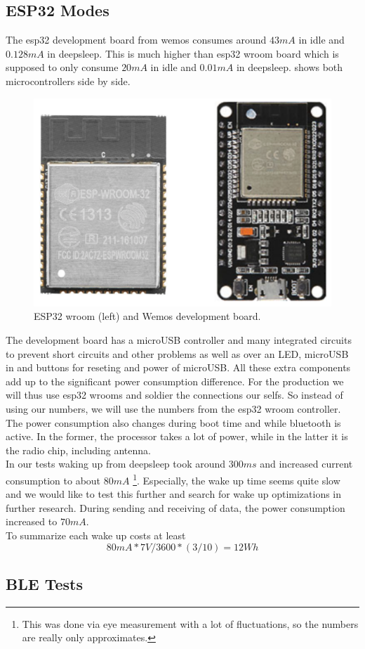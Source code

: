 \subsection{ESP32 Modes}
The esp32 development board from wemos consumes around $43mA$ in idle and $0.128mA$ in deepsleep. This is much higher than esp32 wroom board which is supposed to only consume $20mA$ in idle and $0.01mA$ in deepsleep\cite{InsightI15esp32ModesWroom:online}.  shows both microcontrollers side by side. 

\begin{figure}[H!]
    \centering
    \includegraphics[scale=0.4]{figures/esp32-wroom-wemos.png}%
    \caption{ESP32 wroom (left) and Wemos development board.}\label{fig:esp32Comp}
\end{figure}

The development board has a microUSB controller and many integrated circuits to prevent short circuits and other problems as well as over an LED, microUSB in and buttons for reseting and power of microUSB. All these extra components add up to the significant power consumption difference. For the production we will thus use esp32 wrooms and soldier the connections our selfs. So instead of using our numbers, we will use the numbers from the esp32 wroom controller.\\

The power consumption also changes during boot time and while bluetooth is active. In the former, the processor takes a lot of power, while in the latter it is the radio chip, including antenna. \\

In our tests waking up from deepsleep took around $300ms$ and increased current consumption to about $80mA$ \footnote{This was done via eye measurement with a lot of fluctuations, so the numbers are really only approximates.}. Especially, the wake up time seems quite slow and we would like to test this further and search for wake up optimizations in further research.
During sending and receiving of data, the power consumption increased to $70mA$.\\

To summarize each wake up costs at least
\begin{equation*}
    80mA * 7V / 3600 * (3/10) = 12Wh
\end{equation*}




\subsection{BLE Tests}